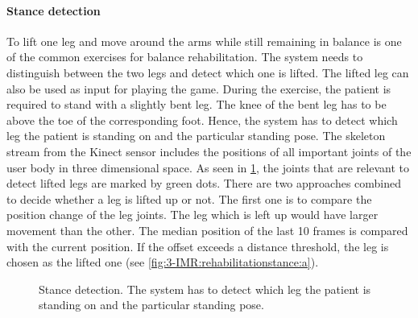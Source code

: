 \paragraph{Stance detection}
To lift one leg and move around the arms while still remaining in balance is one of the common exercises for balance rehabilitation. The system needs to distinguish between the two legs and detect which one is lifted. The lifted leg can also be used as input for playing the game. During the exercise, the patient is required to stand with a slightly bent leg. 
The knee of the bent leg has to be above the toe of the corresponding foot. Hence, the system has to detect which leg the patient is standing on and the particular standing pose. 
The skeleton stream from the Kinect sensor includes the positions of all important joints of the user body in three dimensional space. As seen in \figurename{\ref{fig:3-IMR:rehabilitationstance}}, the joints that are relevant to detect lifted legs are marked by green dots. There are two approaches combined to decide whether a leg is lifted up or not. The first one is to compare the position change of the leg joints. The leg which is left up would have larger movement than the other. The median position of the last 10 frames is compared with the current position. If the offset exceeds a distance threshold, the leg is chosen as the lifted one (see \figurename{\ref{fig:3-IMR:rehabilitationstance:a}}).
\begin{figure}
	\centering
	\caption{Stance detection. The system has to detect which leg the patient is standing on and the particular standing pose.}
	\label{fig:3-IMR:rehabilitationstance}
\end{figure}
